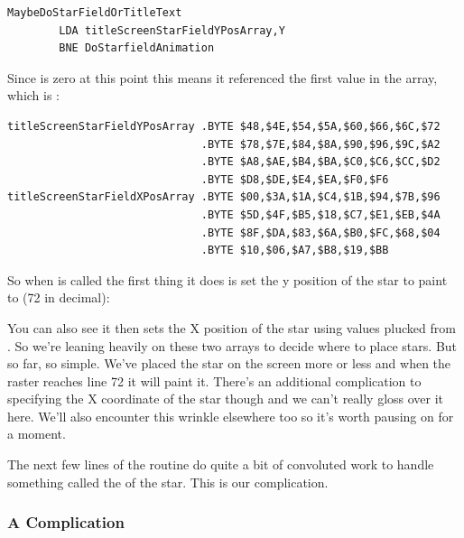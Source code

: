 \begin{lstlisting}
MaybeDoStarFieldOrTitleText   
        LDA titleScreenStarFieldYPosArray,Y
        BNE DoStarfieldAnimation
\end{lstlisting}

Since  is zero at this point this means it referenced the first value in the array, which is :
\begin{lstlisting}[basicstyle=\tiny]
titleScreenStarFieldYPosArray .BYTE $48,$4E,$54,$5A,$60,$66,$6C,$72
                              .BYTE $78,$7E,$84,$8A,$90,$96,$9C,$A2
                              .BYTE $A8,$AE,$B4,$BA,$C0,$C6,$CC,$D2
                              .BYTE $D8,$DE,$E4,$EA,$F0,$F6
titleScreenStarFieldXPosArray .BYTE $00,$3A,$1A,$C4,$1B,$94,$7B,$96
                              .BYTE $5D,$4F,$B5,$18,$C7,$E1,$EB,$4A
                              .BYTE $8F,$DA,$83,$6A,$B0,$FC,$68,$04
                              .BYTE $10,$06,$A7,$B8,$19,$BB
\end{lstlisting}

So when  is called the first thing it does is set the y position of the star to paint
to  (72 in decimal): 

%


You can also see it then sets the X position of the star using values plucked from .
So we're leaning heavily on these two arrays to decide where to place stars. But so far, so simple. We've placed the star
on the screen more or less and when the raster reaches line 72 it will paint it. There's an additional complication to 
specifying the X coordinate of the star though and we can't really gloss over it here. We'll also encounter this
wrinkle elsewhere too so it's worth pausing on for a moment.

The next few lines of the routine do quite a bit of convoluted work to handle something called the  of the
star. This is our complication. 

\subsubsection{A Complication}
%



